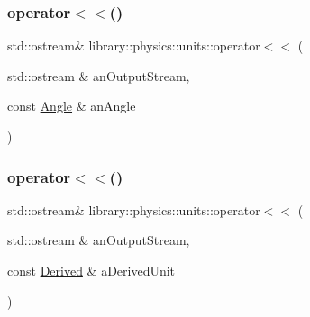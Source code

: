 \subsubsection{\texorpdfstring{operator$<$$<$()}{operator<<()}\hspace{0.1cm}{\footnotesize\ttfamily [2/3]}}
{\footnotesize\ttfamily std\+::ostream\& library\+::physics\+::units\+::operator$<$$<$ (\begin{DoxyParamCaption}\item[{std\+::ostream \&}]{an\+Output\+Stream,  }\item[{const \hyperlink{classlibrary_1_1physics_1_1units_1_1_angle}{Angle} \&}]{an\+Angle }\end{DoxyParamCaption})}

\mbox{\label{namespacelibrary_1_1physics_1_1units_ae5fe5e8cca7d4b7bb172e0919e7173dc}} 
\subsubsection{\texorpdfstring{operator$<$$<$()}{operator<<()}\hspace{0.1cm}{\footnotesize\ttfamily [3/3]}}
{\footnotesize\ttfamily std\+::ostream\& library\+::physics\+::units\+::operator$<$$<$ (\begin{DoxyParamCaption}\item[{std\+::ostream \&}]{an\+Output\+Stream,  }\item[{const \hyperlink{classlibrary_1_1physics_1_1units_1_1_derived}{Derived} \&}]{a\+Derived\+Unit }\end{DoxyParamCaption})}


